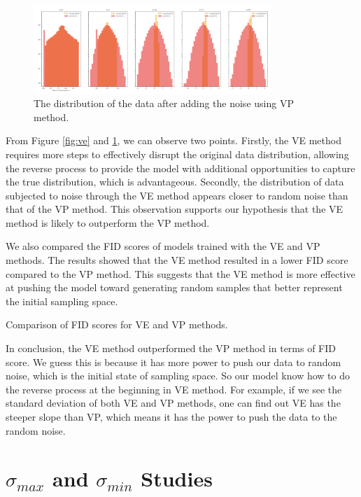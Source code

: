 \begin{figure}[h!]
    \centering
    \includegraphics[width=0.8\textwidth]{Figures/VP_5_0.0001.png}
    \caption{The distribution of the data after adding the noise using VP method.} \label{fig:vp}
\end{figure}

From Figure \ref{fig:ve} and \ref{fig:vp}, we can observe two points. Firstly, the VE method requires more steps to effectively disrupt the original data distribution, allowing the reverse process to provide the model with additional opportunities to capture the true distribution, which is advantageous. Secondly, the distribution of data subjected to noise through the VE method appears closer to random noise than that of the VP method. This observation supports our hypothesis that the VE method is likely to outperform the VP method. 

We also compared the FID scores of models trained with the VE and VP methods. The results showed that the VE method resulted in a lower FID score compared to the VP method. This suggests that the VE method is more effective at pushing the model toward generating random samples that better represent the initial sampling space.

\begin{table}[h!]
    \centering
    \caption{Comparison of FID scores for VE and VP methods.}
\end{table}

In conclusion, the VE method outperformed the VP method in terms of FID score. 
We guess this is because it has more power to push our data to random noise, which is the initial state of sampling space. So our model know how to do the reverse process at the beginning in VE method. For example, if we see the standard deviation of both VE and VP methods, one can find out VE has the steeper slope than VP, which means it has the power to push the data to the random noise.

\section{$\sigma_{max}$ and $\sigma_{min}$ Studies}

